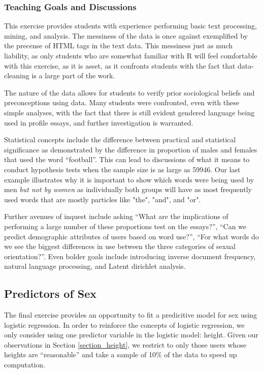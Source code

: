 \documentclass{article}\usepackage[]{graphicx}\usepackage[]{color}
\begin{document}
\subsubsection{Teaching Goals and Discussions}
This exercise provides students with experience performing basic text processing, mining, and analysis.  The messiness of the data is once against exemplified by the precense of HTML tags in the text data.  This messiness just as much liability, as only students who are somewhat familiar with R will feel comfortable with this exercise, as it is asset, as it confronts students with the fact that data-cleaning is a large part of the work.

The nature of the data allows for students to verify prior sociological beliefs and preconceptions using data.  Many students were confronted, even with these simple analyses, with the fact that there is still evident gendered language being used in profile essays, and further investigation is warranted.

Statistical concepts include the difference between practical and statistical significance as demonstrated by the difference in proportion of males and females that used the word ``football''.  This can lead to discussions of what it means to conduct hypothesis tests when the sample size is as large as 59946.  Our last example illustrates why it is important to show which words were being used by men \textit{but not by women} as individually both groups will have as most frequently used words that are mostly particles like "the", "and", and "or".

Further avenues of inquest include asking ``What are the implications of performing a large number of these proportions test on the essays?'', ``Can we predict demographic attributes of users based on word use?'',  ``For what words do we see the biggest differences in use between the three categories of sexual orientation?''.  Even bolder goals include introducing inverse document frequency, natural language processing, and Latent dirichlet analysis\cite{LDA:2003}.







\subsection{Predictors of Sex}
The final exercise provides an opportunity to fit a predicitive model for sex using logistic regression.  In order to reinforce the concepts of logistic regression, we only consider using one predictor variable in the logistic model: height.  Given our observations in Section \ref{section_height}, we restrict to only those users whose heights are ``reasonable'' and take a sample of 10\% of the data to speed up computation.
\end{document}
